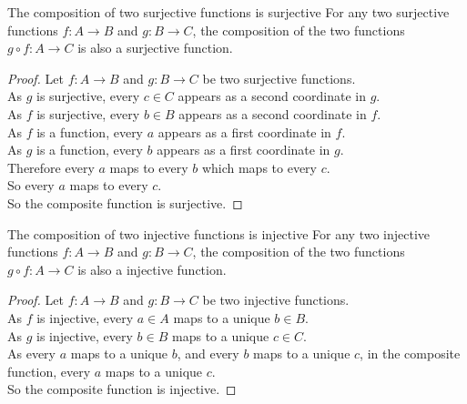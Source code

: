 \documentclass[../notes.tex]{subfiles}
\begin{document}
			\begin{theorem}{The composition of two surjective functions is surjective}
				For any two surjective functions $f: A \rightarrow B$ and $g: B \rightarrow C$, the composition of the two functions\\
					$g \circ f: A \rightarrow C$ is also a surjective function.
					\begin{proof}
						Let $f: A \rightarrow B$ and $g: B \rightarrow C$ be two surjective functions.\\
						As $g$ is surjective, every $c \in C$ appears as a second coordinate in $g$.\\
						As $f$ is surjective, every $b \in B$ appears as a second coordinate in $f$.\\
						As $f$ is a function, every $a$ appears as a first coordinate in $f$.\\
						As $g$ is a function, every $b$ appears as a first coordinate in $g$.\\
						Therefore every $a$ maps to every $b$ which maps to every $c$.\\
						So every $a$ maps to every $c$.\\
						So the composite function is surjective.
					\end{proof}
			\end{theorem}
			\begin{theorem}{The composition of two injective functions is injective}
				For any two injective functions $f: A \rightarrow B$ and $g: B \rightarrow C$, the composition of the two functions\\
					$g \circ f: A \rightarrow C$ is also a injective function.
					\begin{proof}
						Let $f: A \rightarrow B$ and $g: B \rightarrow C$ be two injective functions.\\
						As $f$ is injective, every $a \in A$ maps to a unique $b \in B$.\\
						As $g$ is injective, every $b \in B$ maps to a unique $c \in C$.\\
						As every $a$ maps to a unique $b$, and every $b$ maps to a unique $c$, in the composite function, every $a$ maps to a unique $c$.\\
						So the composite function is injective.
					\end{proof}
			\end{theorem}
\end{document}
